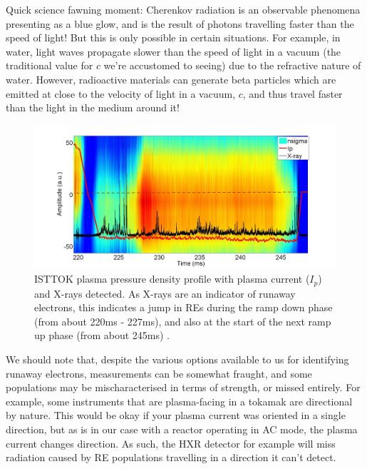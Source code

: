 \begin{remark}
    Quick science fawning moment: Cherenkov radiation is an observable phenomena presenting as a blue 
    glow, and is the result of photons travelling faster than the speed of light! But this is only possible 
    in certain situations. For example, in water, light waves propagate slower than the speed of light in a vacuum
    (the traditional value for $c$ we're accustomed to seeing) due to the refractive nature of water.
    However, radioactive materials can generate beta particles which are emitted at close to the velocity of light 
    in a vacuum, $c$, and thus travel faster than the light in the medium around it! \cite{nobel-cherenkov}
\end{remark}

\begin{figure}[h!]
    \centering
    \includegraphics[scale=0.9]{imgs/c2/re-presence.png}
    \caption{ISTTOK plasma pressure density profile with plasma current ($I_p$) and X-rays detected. As X-rays are 
    an indicator of runaway electrons, this indicates a jump in REs during the ramp down phase (from about 
    220ms - 227ms), and also 
    at the start of the next ramp up phase (from about 245ms) \cite{malaquias-matthew}.}
\end{figure}

We should note that, despite the various options available to us for identifying runaway electrons, 
measurements can be somewhat fraught, and some populations may be mischaracterised in terms of strength, or 
missed entirely. For example, some instruments that are plasma-facing in a tokamak are directional by nature. This would 
be okay if your plasma current was oriented in a single direction, but as is in our case with a reactor operating 
in AC mode, the plasma current changes direction. As such, the HXR detector for example will miss radiation 
caused by RE populations travelling in a direction it can't detect. 
